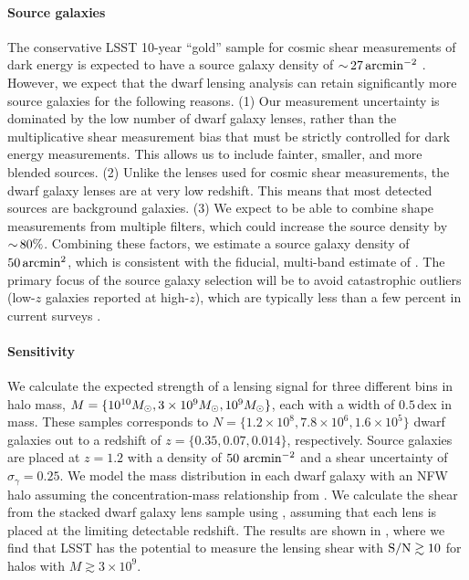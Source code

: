 \paragraph{Source galaxies}
The conservative LSST 10-year ``gold'' sample for cosmic shear measurements of dark energy is expected to have a source galaxy density of $ {\sim}\, 27 \mathrm{\,arcmin}^{-2}$ \citep{Chang:2013,1809.01669}. 
However, we expect that the dwarf lensing analysis can retain significantly more source galaxies for the following reasons.
(1) Our measurement uncertainty is dominated by the low number of dwarf galaxy lenses, rather than the  multiplicative shear measurement bias that must be strictly controlled for dark energy measurements. This allows us to include fainter, smaller, and more blended sources.
(2) Unlike the lenses used for cosmic shear measurements, the dwarf galaxy lenses are at very low redshift. This means that most detected sources are background galaxies.
(3) We expect to be able to combine shape measurements from multiple filters, which could increase the source density by $ {\sim}\, 80\%$. 
Combining these factors, we estimate a source galaxy density of $50 \mathrm{\,arcmin}^2$, which is consistent with the fiducial, multi-band estimate of \citet{Chang:2013}.
The primary focus of the source galaxy selection will be to avoid catastrophic \photoz outliers (low-$z$ galaxies reported at high-$z$), which are typically less than a few percent in current surveys \citep{1406.4407}. 

\paragraph{Sensitivity}
We calculate the expected strength of a lensing signal for three different bins in halo mass,  $M = \{10^{10} M_\odot, 3\times10^9 M_\odot, 10^{9} M_\odot \}$, each with a width of $0.5$\,dex in mass. 
These samples corresponds to $N = \{1.2\times10^8, 7.8\times10^6, 1.6\times10^5\}$ dwarf galaxies out to a redshift of $z = \{0.35, 0.07, 0.014\}$, respectively.
Source galaxies are placed at $z = 1.2$ with a density of $50 \hbox{ arcmin}^{-2}$ and a shear uncertainty of $\sigma_\gamma = 0.25$.
We model the mass distribution in each dwarf galaxy with an NFW halo assuming the concentration-mass relationship from \citet{1809.07326}.
We calculate the shear from the stacked dwarf galaxy lens sample using , assuming that each lens is  placed at the limiting detectable redshift.
The results are shown in , where we find that LSST has the potential to measure the lensing shear with ${\rm S/N} \gtrsim 10$ for halos with $M \gtrsim 3 \times 10^9$.

